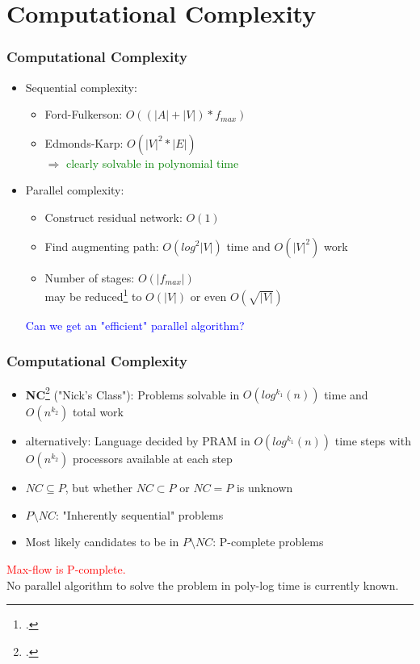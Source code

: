 \documentclass{beamer}
\begin{document}
\section{Computational Complexity}
\begin{frame}
	\frametitle{Computational Complexity}
	\begin{itemize}
		\item Sequential complexity:
		\begin{itemize}
			\item Ford-Fulkerson: $O((|A|+|V|)*f_{max})$
			\item Edmonds-Karp: $O(|V|^{2} * |E|) $
			\pause \\	
			$\Rightarrow$ \textcolor{green}{clearly solvable in polynomial time}
		\end{itemize}
		\pause
		\item Parallel complexity:
		\begin{itemize}
			\item Construct residual network: $O(1)$
			\item Find augmenting path: $O(log^{2}|V|)$ time and $O(|V|^{2})$ work
			\item Number of stages: $O(|f_{max}|)$\\
			may be reduced\footcite{papa95} to $O(|V|)$ or even $O(\sqrt{|V|})$
		\end{itemize}			
		\pause
		\textcolor{blue}{Can we get an "efficient" parallel algorithm?}
	\end{itemize}
\end{frame}

\begin{frame}
	\frametitle{Computational Complexity}
	\begin{itemize}
	\item \textbf{NC}\footcite{papa95} ("Nick's Class"): Problems solvable in $O(log^{k_1}(n))$ time and $O(n^{k_2})$ total work
	\item alternatively: Language decided by PRAM in $O(log^{k_1}(n))$ time steps with $O(n^{k_2})$ processors available at each step 
	\item $NC \subseteq P$, but whether $NC \subset P$ or $NC = P$ is unknown 
	\item $P \setminus NC$: "Inherently sequential"  problems
	\item Most likely candidates to be in $P \setminus NC$: P-complete problems
	\end{itemize}

	\pause	
	\textcolor{red}{Max-flow is P-complete.} \\
	No parallel algorithm to solve the problem in poly-log time is currently known.	
\end{frame}
\end{document}
